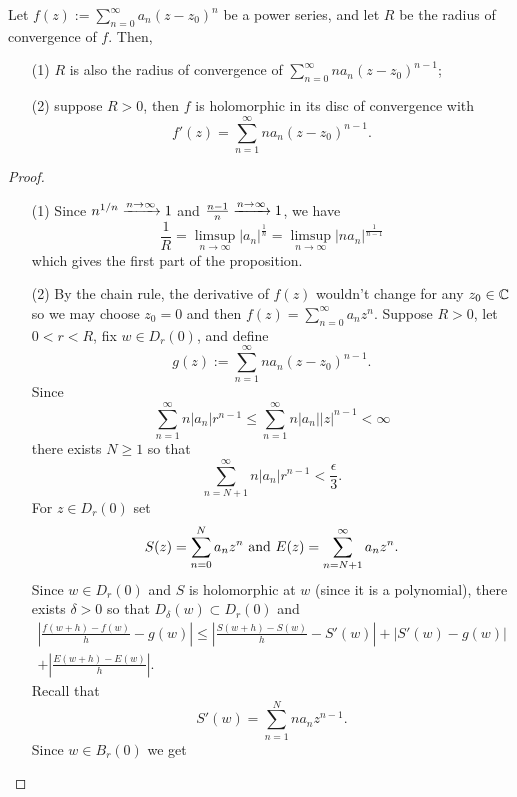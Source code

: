 \documentclass[11pt,a4paper]{article}
\begin{document}
\begin{proposition}
  \label{prop:holo-on-disc}
  Let $f(z) := \sum_{n=0}^{\infty} a_n (z - z_0)^n$ be a power series,
  and let $R$ be the radius of convergence of $f$. Then,
  \begin{enumerate}
    \item[(1)] $R$ is also the radius of convergence of
      $\sum_{n=0}^{\infty} n a_n (z - z_0)^{n - 1}$;
    \item[(2)] suppose $R > 0$, then $f$ is holomorphic in its disc of
      convergence with
      \[
        f'(z) = \sum_{n=1}^{\infty} n a_n (z - z_0)^{n - 1}.
      \]
  \end{enumerate}
\end{proposition}
\begin{proof}
\begin{enumerate} \phantom{}
  \item[(1)] Since $n^{1/n} \xrightarrow{n \to \infty} 1$ and
    $\frac{n-1}{n} \xrightarrow{n \to \infty} 1$, we have
    \[
      \frac{1}{R} =
      \limsup_{n \to \infty} |a_n|^{\frac{1}{n}} =
      \limsup_{n \to \infty} |n a_n|^{\frac{1}{n - 1}}
    \]
    which gives the first part of the proposition.
  \item[(2)] By the chain rule, the derivative of $f(z)$ wouldn't change
    for any $z_0 \in \mathbb{C}$ so we may choose $z_0 = 0$ and then
    $f(z) = \sum_{n=0}^{\infty} a_n z^n$.
    Suppose $R > 0$, let $0 < r < R$, fix $w \in D_r(0)$, and define
    \[
      g(z) := \sum_{n=1}^{\infty} n a_n (z - z_0)^{n - 1}.
    \]
    Since
    \[
      \sum_{n=1}^{\infty} n |a_n| r^{n - 1} \le
      \sum_{n=1}^{\infty} n |a_n| |z|^{n - 1} < \infty
    \]
    there exists $N \geq 1$ so that
    \[
      \sum_{n=N+1}^{\infty} n |a_n| r^{n - 1} < \frac{\epsilon}{3}.
    \]
    For $z \in D_r(0)$ set
    \[
      S(z) = \sum_{n=0}^{N} a_n z^n \text{ and }
      E(z) = \sum_{n=N+1}^{\infty} a_n z^n.
    \]
    Since $w \in D_r(0)$ and $S$ is holomorphic at $w$ 
    (since it is a polynomial), there exists $\delta > 0$ so that
    $D_{\delta}(w) \subset D_r(0)$ and
    \begin{multline*}
      \left|
      \frac{f(w + h) - f(w)}{h} - g(w)
      \right| \le
      \left|
      \frac{S(w + h) - S(w)}{h} - S'(w)
      \right| +
      \left| S'(w) - g(w) \right| \\ +
      \left|
      \frac{E(w + h) - E(w)}{h}
      \right|.
    \end{multline*}
    Recall that
    \[
      S'(w) = \sum_{n=1}^{N} n a_n z^{n - 1}.
    \]
    Since $w \in B_r(0)$ we get

\end{enumerate}
\end{proof}
\end{document}
